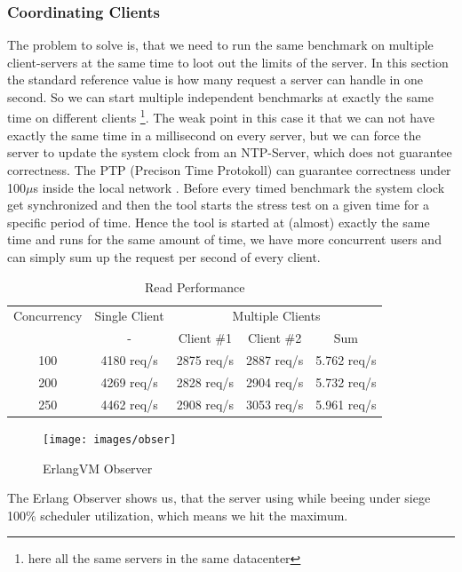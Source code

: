 \subsubsection{Coordinating Clients}\label{coordClie}
{\color{newcode}The problem to solve is, that we need to run the same benchmark on multiple client-servers at the same time to loot out the limits of the server. In this section the standard reference value is how many request a server can handle in one second. So we can start multiple independent benchmarks at exactly the same time on different clients \footnote{here all the same servers in the same datacenter}. The weak point in this case it that we can not have exactly the same time in a millisecond on every server, but we can force the server to update the system clock from an NTP-Server, which does not guarantee correctness. The PTP (Precison Time Protokoll) can guarantee correctness under 100$\mu$s inside the local network \cite{PTP}. Before every timed benchmark the system clock get synchronized and then the tool starts the stress test on a given time for a specific period of time. Hence the tool is started at (almost) exactly the same time and runs for the same amount of time, we have more concurrent users and can simply sum up the request per second of every client. 
} \newline

\begin{table}
 \caption{Read Performance}
\begin{tabular}{c||c|ccc}

Concurrency & Single Client  & \multicolumn{3}{c}{Multiple Clients} \\ 
 & - & Client \#1 & Client \#2 & Sum  \\ 
\hline 
100 & 4180 req/s &  2875 req/s & 2887  req/s& 5.762 req/s \\ 
\hline 
200 & 4269 req/s & 2828 req/s & 2904  req/s& 5.732 req/s \\ 
\hline 
250 & 4462 req/s & 2908 req/s & 3053  req/s& 5.961 req/s \\ 
 
\end{tabular} 
\end{table}

\begin{figure}[H]
  \caption{ErlangVM Observer}
  \label{observer}
    \texttt{[image: images/obser]}
\end{figure}
The Erlang Observer shows us, that the server using while beeing under siege 100\% scheduler utilization, which means we hit the maximum. 

